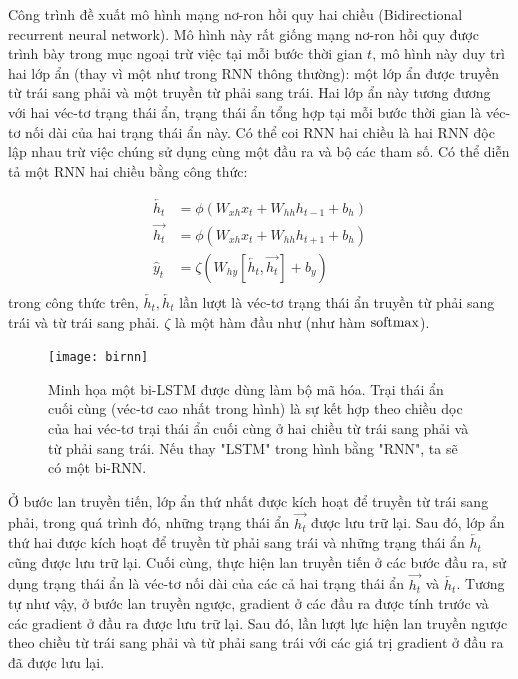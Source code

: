 Công trình \cite{schuster1997} đề xuất mô hình mạng nơ-ron hồi quy hai chiều (Bidirectional recurrent neural network). Mô hình này rất giống mạng nơ-ron hồi quy được trình bày trong mục \cite{rnnsection} ngoại trừ việc tại mỗi bước thời gian $t$, mô hình này duy trì hai lớp ẩn (thay vì một như trong RNN thông thường): một lớp ẩn được truyền từ trái sang phải và một truyền từ phải sang trái. Hai lớp ẩn này tương đương với hai véc-tơ trạng thái ẩn, trạng thái ẩn tổng hợp tại mỗi bước thời gian là véc-tơ nối dài của hai trạng thái ẩn này. Có thể coi RNN hai chiều là hai RNN độc lập nhau trừ việc chúng sử dụng cùng một đầu ra và bộ các tham số. Có thể diễn tả một RNN hai chiều bằng công thức:

\begin{align}
\overleftarrow{h_t} &= \phi \left(W_{xh} x_{t} + W_{hh} h_{t-1} + b_h \right) \\ \label{birnn1} 
\overrightarrow{h_t} &= \phi \left(W_{xh} x_{t} + W_{hh} h_{t+1} + b_h \right) \\ \label{birnn2}
\hat{y}_t &= \zeta \left(W_{hy} \left[\overleftarrow{h_t}, \overrightarrow{h_t} \right] + b_y \right) \\ \label{birnn3}	 \nonumber
\end{align}
trong công thức trên, $\overleftarrow{h_t}, \overleftarrow{h_t}$ lần lượt là véc-tơ trạng thái ẩn truyền từ phải sang trái và từ trái sang phải. $\zeta$ là một hàm đầu như (như hàm $\mathrm{softmax}$).

\begin{figure}
	\centering
	\texttt{[image: birnn]}
	\caption[Minh họa một bi-LSTM được dùng làm bộ mã hóa]{Minh họa một bi-LSTM được dùng làm bộ mã hóa. Trại thái ẩn cuối cùng (véc-tơ cao nhất trong hình) là sự kết hợp theo chiều dọc của hai véc-tơ trại thái ẩn cuối cùng ở hai chiều từ trái sang phải và từ phải sang trái. Nếu thay "LSTM" trong hình bằng "RNN", ta sẽ có một bi-RNN.}
	\label{fig_birnn}
\end{figure}

Ở bước lan truyền tiến, lớp ẩn thứ nhất được kích hoạt để truyền từ trái sang phải, trong quá trình đó, những trạng thái ẩn $\overrightarrow{h_t}$ được lưu trữ lại. Sau đó, lớp ẩn thứ hai được kích hoạt để truyền từ phải sang trái và những trạng thái ẩn $\overleftarrow{h_t}$ cũng được lưu trữ lại. Cuối cùng, thực hiện lan truyền tiến ở các bước đầu ra, sử dụng trạng thái ẩn là véc-tơ nối dài của các cả hai trạng thái ẩn $\overrightarrow{h_t}$ và $\overleftarrow{h_t}$. Tương tự như vậy, ở bước lan truyền ngược, gradient ở các đầu ra được tính trước và các gradient ở đầu ra được lưu trữ lại. Sau đó, lần lượt lực hiện lan truyền ngược theo chiều từ trái sang phải và từ phải sang trái với các giá trị gradient ở đầu ra đã được lưu lại.

